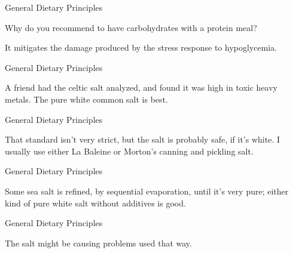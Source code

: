 \documentclass[11pt,oneside,openany,extrafontsizes]{memoir}
\begin{document}
\begin{qaexchange}{General Dietary Principles}

    \begin{question}
        Why do you recommend to have carbohydrates with a protein meal?
    \end{question}

    \begin{answer}
        It mitigates the damage produced by the stress response to hypoglycemia.
    \end{answer}
\end{qaexchange}

\begin{standalonequote}{General Dietary Principles}

    \begin{answer}
        A friend had the celtic salt analyzed, and found it was high in toxic heavy metals. The pure white common salt is best.
    \end{answer}
\end{standalonequote}

\begin{standalonequote}{General Dietary Principles}

    \begin{answer}
        That standard isn't very strict, but the salt is probably safe, if it's white. I usually use either La Baleine or Morton's canning and pickling salt.
    \end{answer}
\end{standalonequote}

\begin{standalonequote}{General Dietary Principles}

    \begin{answer}
        Some sea salt is refined, by sequential evaporation, until it's very pure; either kind of pure white salt without additives is good.
    \end{answer}
\end{standalonequote}

\begin{qaexchange}{General Dietary Principles}

    \begin{answer}
        The salt might be causing problems used that way.
    \end{answer}
\end{qaexchange}
\end{document}
